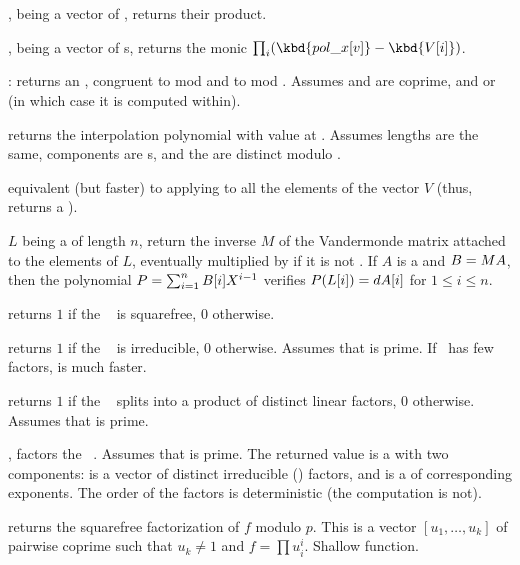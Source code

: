 ,  being a vector of ,
returns their product.

,  being a vector
of s, returns the monic 
$\prod_i (\kbd{pol\_x[v]} - \kbd{V[i]})$.

:
returns an , congruent to  mod  and to  mod
. Assumes  and  are coprime, and 
or  (in which case it is computed within).

 returns the 
interpolation polynomial with value  at . Assumes lengths
are the same, components are s, and the  are distinct
modulo .

 equivalent (but
faster) to applying  to all the elements of the
vector $V$ (thus, returns a ).

 $L$ being a 
of length $n$, return the inverse $M$ of the Vandermonde matrix attached to
the elements of $L$, eventually multiplied by  if it is not
. If $A$ is a  and $B=M\*A$, then the polynomial
$P=\sum_{i=1}^n B[i]\*X^{i-1}$ verifies $P(L[i])=d\*A[i]$ for
$1 \leq i \leq n$.

 returns $1$ if the
~ is squarefree, $0$ otherwise.

 returns $1$ if the ~
is irreducible, $0$ otherwise. Assumes that  is prime. If~ has
few factors,  is much faster.

 returns $1$ if the
~ splits into a product of distinct linear factors, $0$
otherwise. Assumes that  is prime.

, factors the ~. Assumes
that  is prime. The returned value  is a  with two
components:  is a vector of distinct irreducible ()
factors, and  is a  of corresponding exponents. The
order of the factors is deterministic (the computation is not).

 returns the squarefree
factorization of $f$ modulo $p$. This is a vector $[u_1,\dots,u_k]$
of pairwise coprime  such that $u_k \neq 1$ and $f = \prod u_i^i$.
Shallow function.

